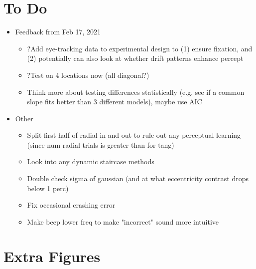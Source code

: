 \documentclass[11pt]{article} %
\begin{document}
\section{To Do} 
\begin{itemize}
\item Feedback from Feb 17, 2021
	\begin{itemize}
	\item ?Add eye-tracking data to experimental design to (1) ensure fixation, and (2) potentially can also look at whether drift patterns enhance percept
	\item ?Test on 4 locations now (all diagonal?)
	\item Think more about testing differences statistically (e.g. see if a common slope fits better than 3 different models), maybe use AIC
	\end{itemize}
\item Other
	\begin{itemize}
	\item Split first half of radial in and out to rule out any perceptual learning (since num radial trials is greater than for tang)
	\item Look into any dynamic staircase methods
	\item Double check sigma of gaussian (and at what eccentricity contrast drops below 1 perc)
	\item Fix occasional crashing error
	\item Make beep lower freq to make "incorrect" sound more intuitive
	\end{itemize}
\end{itemize}

\section{Extra Figures}
\end{document}
